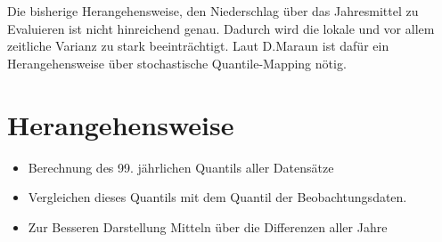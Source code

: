 Die bisherige Herangehensweise, den Niederschlag über das Jahresmittel zu Evaluieren ist nicht hinreichend genau. Dadurch wird die lokale und vor allem zeitliche Varianz zu stark beeinträchtigt. Laut D.Maraun \cite{biasMaraun} ist dafür ein Herangehensweise über stochastische Quantile-Mapping nötig.
\section{Herangehensweise}
\begin{itemize}
	\item Berechnung des 99. jährlichen Quantils aller Datensätze
	\item Vergleichen dieses Quantils mit dem Quantil der Beobachtungsdaten.
	\item Zur Besseren Darstellung Mitteln über die Differenzen aller Jahre
\end{itemize}

